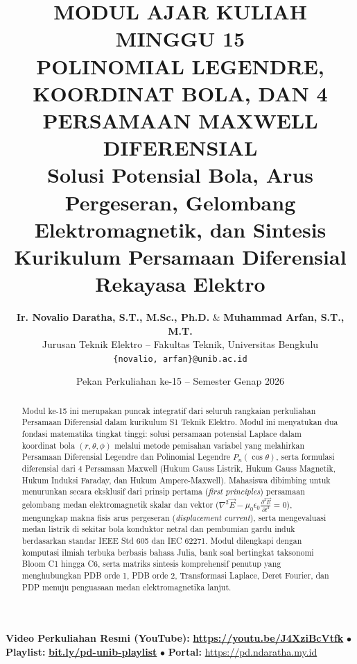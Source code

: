 \documentclass[11pt,a4paper]{article}
\title{
    \vspace{-1.2cm}
    \textbf{\Large MODUL AJAR KULIAH MINGGU 15}\\[0.25cm]
    \textbf{\LARGE POLINOMIAL LEGENDRE, KOORDINAT BOLA, DAN 4 PERSAMAAN MAXWELL DIFERENSIAL}\\[0.2cm]
    \large Solusi Potensial Bola, Arus Pergeseran, Gelombang Elektromagnetik, dan Sintesis Kurikulum Persamaan Diferensial Rekayasa Elektro
}
\author{
    \textbf{Ir. Novalio Daratha, S.T., M.Sc., Ph.D.} \& \textbf{Muhammad Arfan, S.T., M.T.}\\
    Jurusan Teknik Elektro -- Fakultas Teknik, Universitas Bengkulu\\
    \texttt{\{novalio, arfan\}@unib.ac.id}
}
\date{Pekan Perkuliahan ke-15 -- Semester Genap 2026}
\theoremstyle{definition}
\begin{document}
\maketitle
\begin{center}
  \vspace{-0.25cm}
  \begin{tcolorbox}[colback=red!4!white,colframe=red!75!black,boxrule=0.5pt,arc=2pt,left=6pt,right=6pt,top=3pt,bottom=3pt,width=0.98\textwidth]
    \centering\footnotesize
    \textbf{Video Perkuliahan Resmi (YouTube):} {\color{red!80!black}\textbf{\url{https://youtu.be/J4XziBcVtfk}}} \quad $\bullet$ \quad \textbf{Playlist:} \href{https://www.youtube.com/playlist?list=PLS5oOZWXZeTw}{\color{blue!80!black}\textbf{bit.ly/pd-unib-playlist}} \quad $\bullet$ \quad \textbf{Portal:} \url{https://pd.ndaratha.my.id}
  \end{tcolorbox}
  \vspace{-0.15cm}
\end{center}


\begin{abstract}
Modul ke-15 ini merupakan puncak integratif dari seluruh rangkaian perkuliahan Persamaan Diferensial dalam kurikulum S1 Teknik Elektro. Modul ini menyatukan dua fondasi matematika tingkat tinggi: solusi persamaan potensial Laplace dalam koordinat bola $(r, \theta, \phi)$ melalui metode pemisahan variabel yang melahirkan Persamaan Diferensial Legendre dan Polinomial Legendre $P_n(\cos\theta)$, serta formulasi diferensial dari 4 Persamaan Maxwell (Hukum Gauss Listrik, Hukum Gauss Magnetik, Hukum Induksi Faraday, dan Hukum Ampere-Maxwell). Mahasiswa dibimbing untuk menurunkan secara eksklusif dari prinsip pertama (\textit{first principles}) persamaan gelombang medan elektromagnetik skalar dan vektor ($\nabla^2 \vec{E} - \mu_0\epsilon_0 \frac{\partial^2 \vec{E}}{\partial t^2} = 0$), mengungkap makna fisis arus pergeseran (\textit{displacement current}), serta mengevaluasi medan listrik di sekitar bola konduktor netral dan pembumian gardu induk berdasarkan standar IEEE Std 605 dan IEC 62271. Modul dilengkapi dengan komputasi ilmiah terbuka berbasis bahasa Julia, bank soal bertingkat taksonomi Bloom C1 hingga C6, serta matriks sintesis komprehensif penutup yang menghubungkan PDB orde 1, PDB orde 2, Transformasi Laplace, Deret Fourier, dan PDP menuju penguasaan medan elektromagnetika lanjut.
\end{abstract}

\vspace{0.2cm}
\end{document}
